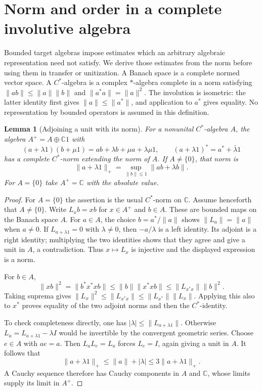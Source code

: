 \documentclass[11pt]{article}
\newtheorem{lemma}[theorem]{Lemma}
\theoremstyle{definition}
\theoremstyle{remark}
\numberwithin{equation}{section}
\newcommand{\C}{\mathbb C}
\begin{document}
\section{Norm and order in a complete involutive algebra}
\label{sec:cstar-prerequisites}

Bounded target algebras impose estimates which an arbitrary algebraic
representation need not satisfy.  We derive those estimates from the norm
before using them in transfer or unitization.
A Banach space is a complete normed vector space.
A $C^*$-algebra is a complex $*$-algebra complete in a norm satisfying
$\|ab\|\leq\|a\|\|b\|$ and $\|a^*a\|=\|a\|^2$.
The involution is isometric: the latter identity first gives
$\|a\|\leq\|a^*\|$, and application to $a^*$ gives equality.
No representation by bounded operators is assumed in this definition.

\begin{lemma}[Adjoining a unit with its norm]
\label{lem:cstar-adjoin}
For a nonunital $C^*$-algebra $A$, the algebra $A^+=A\oplus\C1$ with
\[
 (a+\lambda1)(b+\mu1)=ab+\lambda b+\mu a+\lambda\mu1,
 \qquad (a+\lambda1)^*=a^*+\bar\lambda1
\]
has a complete $C^*$-norm extending the norm of $A$.
If $A\ne\{0\}$, that norm is
\[
 \|a+\lambda1\|_+=\sup_{\|b\|\leq1}\|ab+\lambda b\|.
\]
For $A=\{0\}$ take $A^+=\C$ with the absolute value.
\end{lemma}

\begin{proof}
For $A=\{0\}$ the assertion is the usual $C^*$-norm on $\C$.
Assume henceforth that $A\ne\{0\}$.
Write $L_xb=xb$ for $x\in A^+$ and $b\in A$.
These are bounded maps on the Banach space $A$.
For $a\in A$, the choice $b=a^*/\|a\|$ shows
$\|L_a\|=\|a\|$ when $a\ne0$.
If $L_{a+\lambda1}=0$ with $\lambda\ne0$, then $-a/\lambda$ is a left
identity.  Its adjoint is a right identity; multiplying the two identities
shows that they agree and give a unit in $A$, a contradiction.
Thus $x\mapsto L_x$ is injective and the displayed expression is a norm.

For $b\in A$,
\[
 \|xb\|^2=\|b^*x^*xb\|
 \leq\|b\|\|x^*xb\|\leq\|L_{x^*x}\|\|b\|^2.
\]
Taking suprema gives
$\|L_x\|^2\leq\|L_{x^*x}\|\leq\|L_{x^*}\|\|L_x\|$.
Applying this also to $x^*$ proves equality of the two adjoint norms and
then the $C^*$-identity.

To check completeness directly, one has $|\lambda|\leq\|L_{a+\lambda1}\|$.
Otherwise $L_a=L_{a+\lambda1}-\lambda I$ would be invertible by the
convergent geometric series.  Choose $e\in A$ with $ae=a$.
Then $L_aL_e=L_a$ forces $L_e=I$, again giving a unit in $A$.
It follows that
\[
 \|a+\lambda1\|_+\leq\|a\|+|\lambda|
 \leq3\|a+\lambda1\|_+.
\]
A Cauchy sequence therefore has Cauchy components in $A$ and $\C$, whose
limits supply its limit in $A^+$.
\end{proof}
\end{document}
